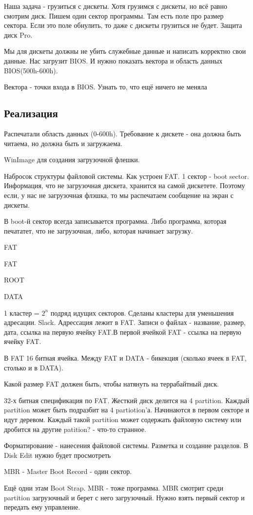 Наша задача - грузиться с дискеты. Хотя грузимся с  дискеты, но всё равно смотрим диск. Пишем один сектор программы. Там есть поле про размер сектора. Если это поле обнулить, то даже с дискеты грузиться не будет. Защита диск Pro.

Мы для дискеты должны не убить служебные данные и написать корректно свои данные. Нас загрузит BIOS. И нужно показать вектора и область данных BIOS(500h-600h).

Вектора - точки входа в BIOS. Узнать то, что ещё ничего не меняла 
\subsection{Реализация}
Распечатали область данных (0-600h). Требование к дискете - она должна быть читаема, но должна быть и загружаема.

WinImage для создания загрузочной флешки.

Набросок структуры файловой системы. Как устроен FAT.
1 сектор - boot sector. Информация, что не загрузочная дискета, хранится на самой дискетете. Поэтому если, у нас не загрузочная флэшка, то мы распечатаем сообщение на экран с дискеты.

В boot-й сектор всегда записывается программа. Либо программа, которая печататет, что не загрузочная, либо, которая начинает загрузку.


FAT

FAT

ROOT

DATA

1 кластер = $2^n$ подряд идущих секторов. Сделаны кластеры для уменьшения адресации. Slack.
Адрессация лежит в FAT. Записи о файлах - название, размер, дата, ссылка на первую ячейку FAT.В первой ячейкой FAT - ссылка на первую ячейку FAT.

В FAT 16 битная ячейка. Между FAT и DATA - бикекция (сколько ячеек в FAT, столько и в DATA).
\begin{hw}
Какой размер FAT должен быть, чтобы натянуть на террабайтный диск.
\end{hw}  
32-х битная спецификация по FAT.
Жесткий диск делится на 4 partition. Каждый partition может быть подразбит на 4 partiotion'а.
Начинаются в первом секторе и идут деревом. Каждый такой partition может содержать файловую систему или дробится на другие patition? - что-то странное.

Форматирование - нанесения файловой системы. Разметка и создание разделов. 
В Disk Edit нужно будет просмотреть 

MBR - Master Boot Record - один сектор.

Ещё одни этам Boot Strap. MBR - тоже программа. MBR смотрит среди partition загрузочный и берет с него загрузочный. Нужно взять первый сектор и передать ему управление.